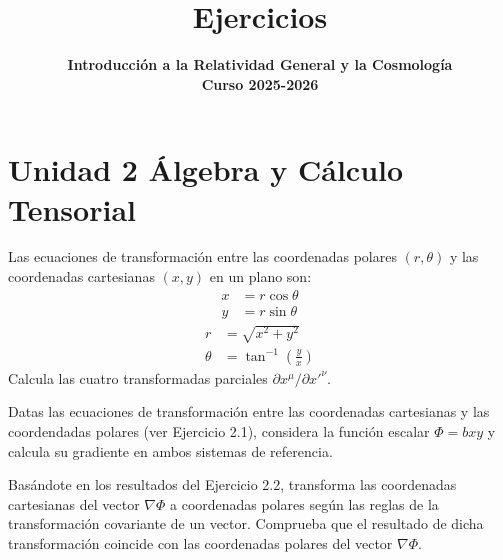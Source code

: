 \documentclass[12pt]{article}
\newenvironment{exercise}[2][Ejercicio]{\begin{trivlist} 
\item[\hskip \labelsep {\bfseries #1}\hskip \labelsep {\bfseries #2.}]}{\end{trivlist}}
\begin{document}
 
 
\title{\textbf{Ejercicios}}
\author{\textbf{Introducción a la Relatividad General y la Cosmología}\\
\textbf{Curso 2025-2026}}\date{} 
\maketitle

\section*{Unidad 2 Álgebra y Cálculo Tensorial}

\begin{exercise}{2.1} 
Las ecuaciones de transformación entre las coordenadas polares $(r, \theta)$ y las coordenadas cartesianas $(x, y)$ en un plano son:
\begin{align*}
x &= r\cos\theta\\
y &= r\sin\theta
\end{align*}
\begin{align*}
r &= \sqrt{x^{2}+y^{2}}\\
\theta &= \tan^{-1}\!\left(\frac{y}{x}\right)
\end{align*}
Calcula las cuatro transformadas parciales $\partial{x^{\mu}}/\partial{x'^{\nu}}$. 
\end{exercise}

\begin{exercise}{2.2} 
Datas las ecuaciones de transformación entre las coordenadas cartesianas y las coordendadas polares (ver Ejercicio 2.1), considera la función escalar $\Phi = bxy$ y calcula su gradiente en ambos sistemas de referencia.
\end{exercise}

\begin{exercise}{2.3}
Basándote en los resultados del Ejercicio 2.2, transforma las coordenadas cartesianas del vector $\nabla \Phi$ a coordenadas polares según las reglas de la transformación covariante de un vector. Comprueba que el resultado de dicha transformación coincide con las coordenadas polares del vector $\nabla \Phi$.
\end{exercise}
\end{document}
